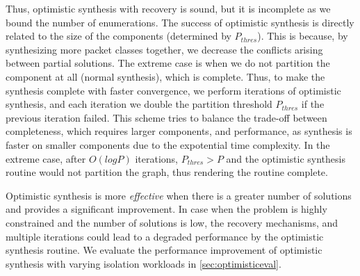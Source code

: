 Thus, optimistic synthesis with recovery is sound, but 
it is incomplete as we bound the
number of enumerations. The success of optimistic synthesis
is directly related to the size of the components (determined by $P_{thres}$). 
This is because, by synthesizing more packet classes together, we decrease the
conflicts arising between partial solutions. The extreme case is when we do not 
partition the component at all (normal synthesis), which is complete. 
Thus, to make the synthesis complete with faster convergence, we
perform iterations of optimistic synthesis, and each iteration we double the
partition threshold $P_{thres}$ if the previous iteration failed. 
This scheme tries to balance the trade-off between completeness, which
requires larger components, and performance, as synthesis is faster on smaller
components due to the expotential time complexity. In the extreme case, after $O(log P)$
iterations, $P_{thres} > P$ and the optimistic synthesis routine would not partition the graph,
thus rendering the routine complete. 
 
 Optimistic synthesis is more \emph{effective}
 when there is a greater number of solutions and provides a
 significant improvement. In case when the problem is highly 
 constrained and the number of solutions is low, 
 the recovery mechanisms, and multiple iterations could 
 lead to a degraded performance by the optimistic synthesis 
 routine. We evaluate the performance improvement of optimistic
 synthesis with varying isolation workloads in \cref{sec:optimisticeval}.

 
%
